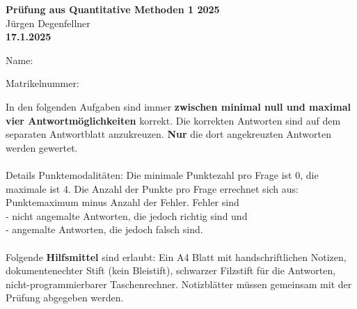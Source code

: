 \documentclass[10pt,addpoints]{exam}
\begin{document}
\begin{center}
\textbf{\Huge Prüfung aus Quantitative Methoden 1 2025} \\
\vspace{0.5cm}
Jürgen Degenfellner\\
\vspace{0.5cm}
\textbf{\large 17.1.2025}
\end{center}
\vspace{1cm}

\noindent Name:  \\
    
\vspace{5mm} %

\noindent Matrikelnummer: 

\vspace{10mm}

\noindent In den folgenden Aufgaben sind immer \textbf{zwischen minimal null und maximal vier Antwortmöglichkeiten} korrekt. Die korrekten Antworten sind auf dem separaten Antwortblatt anzukreuzen. \textbf{Nur} die dort angekreuzten Antworten werden gewertet. \\
\\
Details Punktemodalitäten: Die minimale Punktezahl pro Frage ist 0, die maximale ist 4. Die Anzahl der Punkte pro Frage errechnet sich aus: Punktemaximum minus Anzahl der Fehler. Fehler sind \\
 - nicht angemalte Antworten, die jedoch richtig sind und \\
 - angemalte Antworten, die jedoch falsch sind. \\
\\
Folgende \textbf{Hilfsmittel} sind erlaubt: Ein A4 Blatt mit handschriftlichen Notizen, dokumentenechter Stift (kein Bleistift), schwarzer Filzstift für die Antworten, nicht-programmierbarer Taschenrechner. Notizblätter müssen gemeinsam mit der Prüfung abgegeben werden. 
\vspace{1cm}
\end{document}

